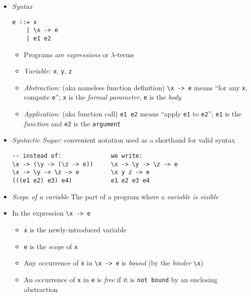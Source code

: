 \documentclass[landscape,8pt]{extarticle}
\newcommand{\code}{\lstinline}
\begin{document}
\footnotesize
\begin{multicols}{4}
    \setlength{\premulticols}{1pt}
    \setlength{\postmulticols}{1pt}
    \setlength{\multicolsep}{1pt}
    \setlength{\columnsep}{2pt}
    \begin{itemize}
        \item \emph{Syntax}
              \begin{lstlisting}
e ::= x
    | \x -> e
    | e1 e2
        \end{lstlisting}
              \begin{itemize}
                  \item Programs are \emph{expressions} or $\lambda$-terms
                  \item \emph{Variable:} \code{x}, \code{y}, \code{z}
                  \item \emph{Abstraction:} (aka nameless function definition) \code{\x -> e} means ``for any \code{x}, compute \code{e}''; \code{x} is the \emph{formal parameter}, \code{e} is the \emph{body}
                  \item \emph{Application:} (aka function call) \code{e1 e2} means ``apply \code{e1} to \code{e2}''; \code{e1} is the \emph{function} and \code{e2} is the \code{argument}
              \end{itemize}
        \item \emph{Syntactic Sugar:} convenient notation used as a shorthand for valid syntax
              \begin{lstlisting}
-- instead of:              we write:
\x -> (\y -> (\z -> e))     \x -> \y -> \z -> e
\x -> \y -> \z -> e         \x y z -> e
(((e1 e2) e3) e4)           e1 e2 e3 e4
        \end{lstlisting}
        \item \emph{Scope of a variable} The part of a program where a \emph{variable is visible}
        \item In the expression \code{\x -> e}
              \begin{itemize}
                  \item \code{x} is the newly-introduced variable
                  \item \code{e} is the \emph{scope} of \code{x}
                  \item Any occurrence of \code{x} in \code{\x -> e} is \emph{bound} (by the \emph{binder} \code{\x})
                  \item An occurrence of \code{x} in \code{e} is \emph{free} if it is \code{not bound} by an enclosing abstraction

\end{itemize}
\end{itemize}
\end{multicols}
\end{document}
